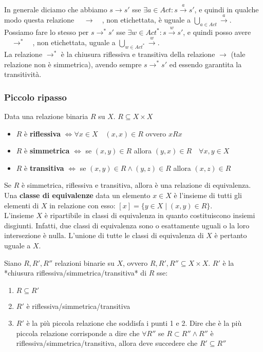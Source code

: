 In generale diciamo che abbiamo $s \to s' $ sse $\exists a \in Act : s \stackrel{a} \to s'$, e quindi in qualche modo questa relazione $\quad \to \quad$, non etichettata, è uguale a $\displaystyle \bigcup\limits_{a\in Act}\stackrel{a}{\rightarrow}$. \\
Possiamo fare lo stesso per $s \to^* s'$ sse $\exists w \in Act^* : s \stackrel{w} \to s'$, e quindi posso avere 
$\quad \to^* \quad$, non etichettata, uguale a $\displaystyle \bigcup\limits_{w\in Act^*}\stackrel{w}{\rightarrow}$.\\

La relazione $\rightarrow^*$ è la chiusura riflessiva e transitiva della relazione $\rightarrow$ (tale relazione non è simmetrica), avendo sempre $s\rightarrow^*s'$ ed essendo garantita la transitività.\\

\subsubsection{Piccolo ripasso}
Data una relazione binaria $R$ su $X$. $R \subseteq X \times X$ \begin{itemize}
    \item $R$ è \textbf{riflessiva} $\iff \forall x \in X \quad (x,x) \in R$ ovvero $xRx$ 
    \item $R$ è \textbf{simmetrica} $\iff$ se $(x,y) \in R$ allora $(y,x) \in R \quad \forall x,y \in X$ 
    \item $R$ è \textbf{transitiva} $\iff$ se $(x,y) \in R \land (y,z) \in R$ allora $(x,z) \in R$ 
\end{itemize}
Se $R$ è simmetrica, riflessiva e transitiva, allora è una relazione di equivalenza.
Una \textbf{classe di equivalenze} data un elemento $x \in X$ è l’insieme di tutti gli elementi di $X$ in relazione con esso: $[x] = \{y \in X \; | \; (x,y) \in R\}$. \\
L’insieme $X$ è ripartibile in classi di equivalenza in quanto costituiscono insiemi disgiunti. Infatti, due classi di equivalenza sono o esattamente uguali o la loro intersezione è nulla. L’unione di tutte le classi di equivalenza di $X$ è pertanto uguale a $X$. 

Siano $R, R', R''$ relazioni binarie su $X$, ovvero $R, R', R'' \subseteq X \times X$. $R'$ è la *chiusura riflessiva/simmetrica/transitiva* di $R$ sse: 
\begin{enumerate}
    \item $R \subseteq R'$
    \item $R'$ è riflessiva/simmetrica/transitiva
    \item $R'$ è la più piccola relazione che soddisfa i punti 1 e 2. Dire che è la più piccola relazione corrisponde a dire che $\forall R''$ se $R \subset R'' \land R''$ è riflessiva/simmetrica/transitiva, allora deve succedere che $R' \subseteq R''$
\end{enumerate}

